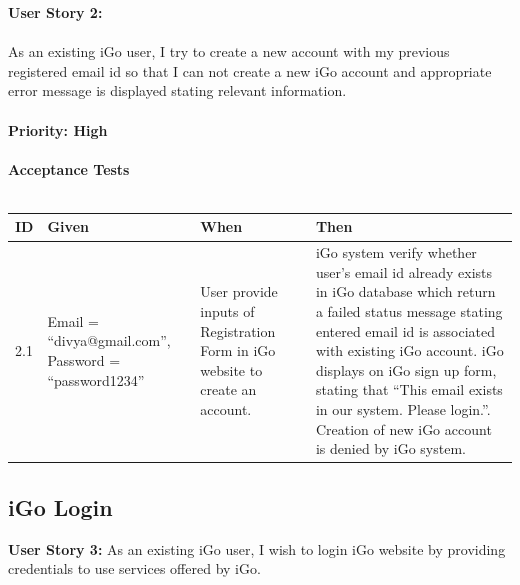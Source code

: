 \documentclass[11pt, english]{report}
\begin{document}
\vspace*{0.2in}
\textbf{User Story 2: }\\ \\
As an existing iGo user, I try to create a new account with my previous registered email id so that I can not create a new iGo account and appropriate error message is displayed stating relevant information.
\\ \\
\textbf{Priority: High} \\ \\
\textbf{Acceptance Tests} \\ \\
\setlength{\tabcolsep}{18pt}
\renewcommand{\arraystretch}{1.5}
\begin{tabular}{ |p{0.5cm}|p{3cm}|p{3.5cm}|p{5cm}| }
\hline
\textbf{ID} & \textbf{Given} & \textbf{When} & \textbf{Then}\\
\hline
2.1 &
Email = “divya@gmail.com”, 
Password = “password1234”
&
User provide inputs of Registration Form in iGo website to create an account. &
iGo system verify whether user's email id already exists in iGo database which return a failed  status message stating entered email id is associated with existing iGo account.
iGo displays on iGo sign up form, stating that “This email exists in our system. Please login.”.
Creation of new iGo account is denied by iGo system.

\\
\hline
\end{tabular}

\subsection{iGo Login}
\textbf{User Story 3: }
As an existing iGo user, I wish to login iGo website by providing credentials to use services offered by iGo.
\end{document}

